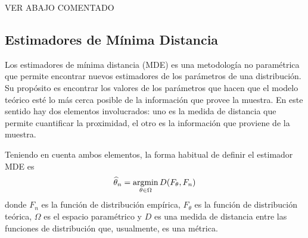 %


VER ABAJO COMENTADO


\subsection{Estimadores de Mínima Distancia}
\label{MDE}

Los estimadores de mínima distancia (MDE) es una metodología no paramétrica que permite encontrar nuevos estimadores de los parámetros de una distribución. Su propósito es encontrar los valores de los parámetros que hacen que el modelo teórico esté lo más cerca posible de la información que provee la muestra. En este sentido hay dos elementos involucrados: uno es la medida de distancia que permite cuantificar la proximidad, el otro es la información que proviene de la muestra. 

Teniendo en cuenta ambos elementos, la forma habitual de definir el estimador MDE es 
\begin{align}
\label{DistDistribucion}
\widehat{\theta}_n=\mathop{\rm argmin}\limits_{\theta\in\Omega} D(F_{\theta},F_n)
\end{align}
donde $F_n$ es la función de distribución empírica, $F_{\theta}$ es la función de distribución teórica, $\Omega$ es el espacio paramétrico y $D$ es una medida de distancia entre las funciones de distribución que, usualmente, es una métrica.

